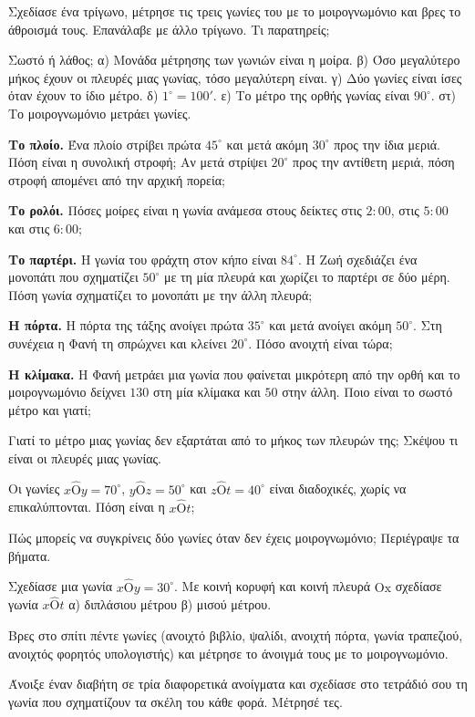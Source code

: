 \ex Σχεδίασε ένα τρίγωνο, μέτρησε τις τρεις γωνίες του με το μοιρογνωμόνιο και βρες το άθροισμά τους. Επανάλαβε με άλλο τρίγωνο. Τι παρατηρείς;

\ex Σωστό ή λάθος; α) Μονάδα μέτρησης των γωνιών είναι η μοίρα. \quad β) Όσο μεγαλύτερο μήκος έχουν οι πλευρές μιας γωνίας, τόσο μεγαλύτερη είναι. \quad γ) Δύο γωνίες είναι ίσες όταν έχουν το ίδιο μέτρο. \quad δ) $1^\circ=100'$. \quad ε) Το μέτρο της ορθής γωνίας είναι $90^\circ$. \quad στ) Το μοιρογνωμόνιο μετράει γωνίες.


\ex \textbf{Το πλοίο.} Ένα πλοίο στρίβει πρώτα $45^\circ$ και μετά ακόμη $30^\circ$ προς την ίδια μεριά. Πόση είναι η συνολική στροφή; Αν μετά στρίψει $20^\circ$ προς την αντίθετη μεριά, πόση στροφή απομένει από την αρχική πορεία;

\ex \textbf{Το ρολόι.} Πόσες μοίρες είναι η γωνία ανάμεσα στους δείκτες στις $2{:}00$, στις $5{:}00$ και στις $6{:}00$;

\ex \textbf{Το παρτέρι.} Η γωνία του φράχτη στον κήπο είναι $84^\circ$. Η Ζωή σχεδιάζει ένα μονοπάτι που σχηματίζει $50^\circ$ με τη μία πλευρά και χωρίζει το παρτέρι σε δύο μέρη. Πόση γωνία σχηματίζει το μονοπάτι με την άλλη πλευρά;

\ex \textbf{Η πόρτα.} Η πόρτα της τάξης ανοίγει πρώτα $35^\circ$ και μετά ανοίγει ακόμη $50^\circ$. Στη συνέχεια η Φανή τη σπρώχνει και κλείνει $20^\circ$. Πόσο ανοιχτή είναι τώρα;

\ex \textbf{Η κλίμακα.} Η Φανή μετράει μια γωνία που φαίνεται μικρότερη από την ορθή και το μοιρογνωμόνιο δείχνει $130$ στη μία κλίμακα και $50$ στην άλλη. Ποιο είναι το σωστό μέτρο και γιατί;


\ex Γιατί το μέτρο μιας γωνίας δεν εξαρτάται από το μήκος των πλευρών της; Σκέψου τι είναι οι πλευρές μιας γωνίας.

\ex Οι γωνίες $x\hat{\mathrm{Ο}}y=70^\circ$, $y\hat{\mathrm{Ο}}z=50^\circ$ και $z\hat{\mathrm{Ο}}t=40^\circ$ είναι διαδοχικές, χωρίς να επικαλύπτονται. Πόση είναι η $x\hat{\mathrm{Ο}}t$;

\ex Πώς μπορείς να συγκρίνεις δύο γωνίες όταν δεν έχεις μοιρογνωμόνιο; Περιέγραψε τα βήματα.

\ex Σχεδίασε μια γωνία $x\hat{\mathrm{Ο}}y=30^\circ$. Με κοινή κορυφή και κοινή πλευρά $\mathrm{Οx}$ σχεδίασε γωνία $x\hat{\mathrm{Ο}}t$ α) διπλάσιου μέτρου \quad β) μισού μέτρου.


\ex Βρες στο σπίτι πέντε γωνίες (ανοιχτό βιβλίο, ψαλίδι, ανοιχτή πόρτα, γωνία τραπεζιού, ανοιχτός φορητός υπολογιστής) και μέτρησε το άνοιγμά τους με το μοιρογνωμόνιο.

\ex Άνοιξε έναν διαβήτη σε τρία διαφορετικά ανοίγματα και σχεδίασε στο τετράδιό σου τη γωνία που σχηματίζουν τα σκέλη του κάθε φορά. Μέτρησέ τες.
